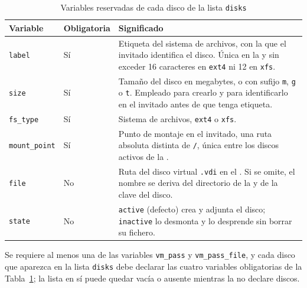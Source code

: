 \begin{table}[H]
    \centering
    \caption{Variables reservadas de cada disco de la lista \texttt{disks}}
    \label{tab:claves-disco}
    \begin{tabular}{@{}llp{8.4cm}@{}}
        \toprule
        \textbf{Variable} & \textbf{Obligatoria} & \textbf{Significado} \\
        \midrule
        \texttt{label} & Sí & Etiqueta del sistema de archivos, con la que el invitado identifica el disco. Única en la \vm{} y sin exceder 16 caracteres en \texttt{ext4} ni 12 en \texttt{xfs}. \\
        \texttt{size} & Sí & Tamaño del disco en megabytes, o con sufijo \texttt{m}, \texttt{g} o \texttt{t}. Empleado para crearlo y para identificarlo en el invitado antes de que tenga etiqueta. \\
        \texttt{fs\_type} & Sí & Sistema de archivos, \texttt{ext4} o \texttt{xfs}. \\
        \texttt{mount\_point} & Sí & Punto de montaje en el invitado, una ruta absoluta distinta de \texttt{/}, única entre los discos activos de la \vm{}. \\
        \texttt{file} & No & Ruta del disco virtual \texttt{.vdi} en el \host{}. Si se omite, el nombre se deriva del directorio de la \vm{} y de la clave del disco. \\
        \texttt{state} & No & \texttt{active} (defecto) crea y adjunta el disco; \texttt{inactive} lo desmonta y lo desprende sin borrar su fichero. \\
        \bottomrule
    \end{tabular}
\end{table}

\noindent Se requiere al menos una de las variables \texttt{vm\_pass} y \texttt{vm\_pass\_file}, y cada disco que aparezca en la lista \texttt{disks} debe declarar las cuatro variables obligatorias de la Tabla~\ref{tab:claves-disco}; la lista en sí puede quedar vacía o ausente mientras la \vm{} no declare discos.

